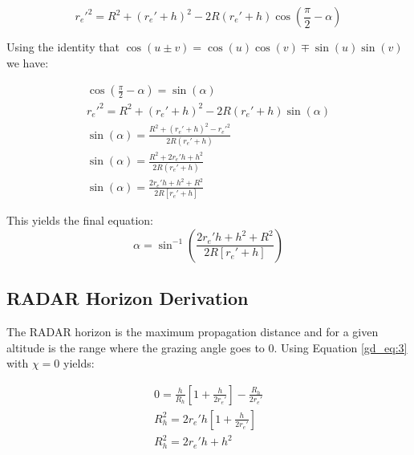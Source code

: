 \begin{equation}
r_e'^2 = R^2 + \left(r_e' + h \right)^2 - 2R\left(r_e' + h \right)\cos\left(\frac{\pi}{2} - \alpha \right)
\label{gd_eq:4}
\end{equation}
\renewcommand{\baselinestretch}{2} \small\normalsize

\noindent Using the identity that $\cos(u \pm v) = \cos(u)\cos(v) \mp \sin(u)\sin(v)$ we have:

\begin{equation}
\begin{gathered}
\cos\left(\frac{\pi}{2} - \alpha \right) = \sin\left(\alpha\right) \\
r_e'^2 = R^2 + \left(r_e' + h \right)^2 - 2R\left(r_e' + h \right) \sin\left(\alpha\right)\\
\sin\left(\alpha\right) = \frac{R^2 + \left(r_e' + h \right)^2 - r_e'^2}{2R\left(r_e' + h \right)} \\
\sin\left(\alpha\right) = \frac{R^2 + 2r_e'h + h^2}{2R\left(r_e' + h \right)}\\
\sin\left(\alpha\right) =  \frac{2r_e'h + h^2 + R^2}{2R\left[r_e' + h \right]}
\end{gathered}
\label{gd_eq:5}
\end{equation}
\renewcommand{\baselinestretch}{2} \small\normalsize

\noindent This yields the final equation:
\begin{equation}
\label{gd_eq:6}
\boxed{\alpha = \sin^{-1}\left(\frac{2r_e'h + h^2 + R^2}{2R\left[r_e' + h \right]} \right)}
\end{equation}
\renewcommand{\baselinestretch}{2} \small\normalsize

\subsection{RADAR Horizon Derivation}
The RADAR horizon is the maximum propagation distance and for a given altitude is the range where the grazing angle goes to $0$. Using Equation \ref{gd_eq:3} with $\chi = 0$ yields:

\begin{equation}
\begin{gathered}
\label{gd_eq:7}
0 = \frac{h}{R_h}\left[1 + \frac{h}{2r_e'} \right] - \frac{R_h}{2r_e'} \\
R_h^2 = 2r_e'h\left[1 + \frac{h}{2r_e'} \right] \\
R_h^2 = 2r_e'h + h^2
\end{gathered}
\end{equation}

